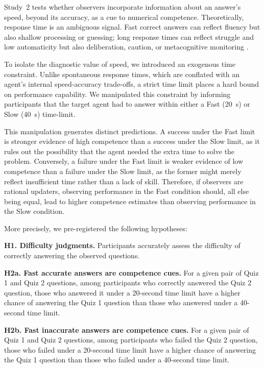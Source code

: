 \documentclass[10pt,letterpaper]{article}
\begin{document}
Study~2 tests whether observers incorporate information about an answer's speed, beyond its accuracy, as a cue to numerical competence. Theoretically, response time is an ambiguous signal. Fast correct answers can reflect fluency but also shallow processing or guessing; long response times can reflect struggle and low automaticity but also deliberation, caution, or metacognitive monitoring \citep{Berke-2023,Goldhammer-2011,Hedge-2018,Kruger-2004,Richardson-2022}.

To isolate the diagnostic value of speed, we introduced an exogenous time constraint. Unlike spontaneous response times, which are conflated with an agent's internal speed-accuracy trade-offs, a strict time limit places a hard bound on performance capability. We manipulated this constraint by informing participants that the target agent had to answer within either a Fast (20~s) or Slow (40~s) time-limit.

This manipulation generates distinct predictions. A success under the Fast limit is stronger evidence of high competence than a success under the Slow limit, as it rules out the possibility that the agent needed the extra time to solve the problem. Conversely, a failure under the Fast limit is weaker evidence of low competence than a failure under the Slow limit, as the former might merely reflect insufficient time rather than a lack of skill. Therefore, if observers are rational updaters, observing performance in the Fast condition should, all else being equal, lead to higher competence estimates than observing performance in the Slow condition.

More precisely, we pre-registered the following hypotheses:

\textbf{H1. Difficulty judgments.} Participants accurately assess the difficulty of correctly answering the observed questions.

\textbf{H2a. Fast accurate answers are competence cues.} For a given pair of Quiz 1 and Quiz 2 questions, among participants who correctly answered the Quiz 2 question, those who answered it under a 20-second time limit have a higher chance of answering the Quiz 1 question than those who answered under a 40-second time limit.

\textbf{H2b. Fast inaccurate answers are competence cues.} For a given pair of Quiz 1 and Quiz 2 questions, among participants who failed the Quiz 2 question, those who failed under a 20-second time limit have a higher chance of answering the Quiz 1 question than those who failed under a 40-second time limit.
\end{document}
